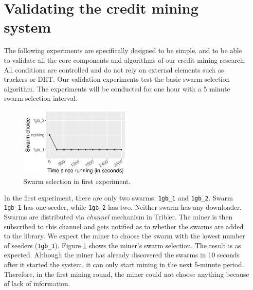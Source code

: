 \section{Validating the credit mining system}
\label{section:cmsvalidation}
The following experiments are specifically designed to be simple, and to be able to validate all the core components and algorithms of our credit mining research. All conditions are controlled and do not rely on external elements such as trackers or DHT. Our validation experiments test the basic swarm selection algorithm. The experiments will be conducted for one hour with a 5 minute swarm selection interval. 

\begin{figure}[h]
	\centering
	\includegraphics[width=0.5\textwidth]{pics/results/val0.pdf}
	\caption{Swarm selection in first experiment.}
	\label{fig:val0}
\end{figure}

In the first experiment, there are only two swarms: \texttt{1gb\_1} and \texttt{1gb\_2}. Swarm \texttt{1gb\_1} has one seeder, while \texttt{1gb\_2} has two. Neither swarm has any downloader. Swarms are distributed via \textit{channel} mechanism in Tribler. The miner is then subscribed to this channel and gets notified as to whether the swarms are added to the library. We expect the miner to choose the swarm with the lowest number of seeders (\texttt{1gb\_1}). Figure \ref{fig:val0} shows the miner's swarm selection. The result is as expected. Although the miner has already discovered the swarms in 10 seconds after it started the system, it can only start mining in the next 5-minute period. Therefore, in the first mining round, the miner could not choose anything because of lack of information.

